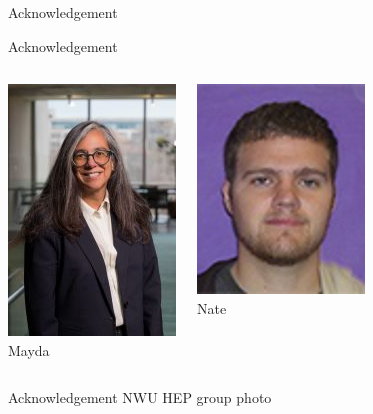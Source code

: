 \begin{frame}{}
\large
    \begin{center}
        Acknowledgement
    \end{center}
\end{frame}


\begin{frame}{Acknowledgement}

    \begin{columns}
        \centering
        \includegraphics[height=0.5\textheight]{slides/figures/mayda}\\
        Mayda
        
        \centering
        \includegraphics[height=0.5\textheight]{slides/figures/nate}\\
        Nate
    \end{columns}
\end{frame}


\begin{frame}{Acknowledgement}
    \centering
    NWU HEP group photo
\end{frame}



